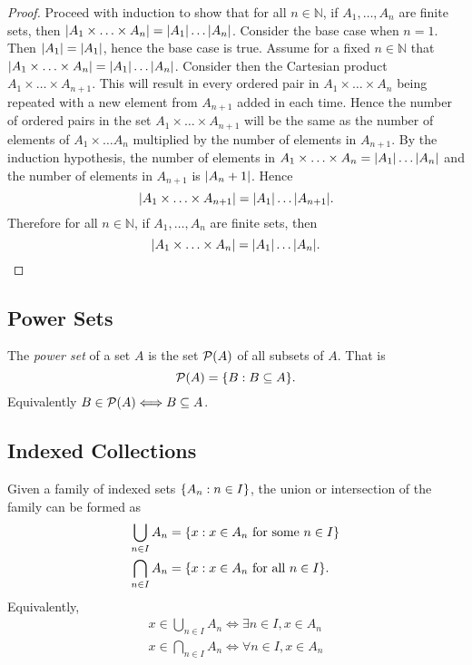 \documentclass[../notes.tex]{subfiles}
\begin{document}
\begin{proof}
	Proceed with induction to show that for all $n\in\mathbb{N}$, if $A_1, \ldots , A_n$ are finite sets, then $\qty|A_1 \times \ldots \times A_n| = \qty|A_1| \ldots \qty|A_n|$. Consider the base case when $n = 1$. Then $\qty|A_1| = \qty|A_1|$, hence the base case is true. Assume for a fixed $n \in \mathbb{N}$ that $\qty|A_1 \times \ldots \times A_n| = \qty|A_1| \ldots \qty|A_n|$. Consider then the Cartesian product $A_1 \times \ldots \times A_{n+1}$. This will result in every ordered pair in $A_1 \times \ldots \times A_n$ being repeated with a new element from $A_{n+1}$ added in each time. Hence the number of ordered pairs in the set $A_1 \times \ldots \times A_{n+1}$ will be the same as the number of elements of $A_1 \times \ldots A_n$ multiplied by the number of elements in $A_{n+1}$. By the induction hypothesis, the number of elements in $A_1 \times \ldots \times A_n = \qty|A_1| \ldots \qty|A_n|$ and the number of elements in $A_{n+1}$ is $\qty|A_n+1|$. Hence
	\[
		\qty|A_1 \times \ldots \times A_{n+1}| = \qty|A_1| \ldots \qty|A_{n+1}|
	.\]
	Therefore for all $n\in\mathbb{N}$, if $A_1, \ldots , A_n$ are finite sets, then 
	\[
		\qty|A_1 \times \ldots \times A_n| = \qty|A_1| \ldots \qty|A_n|
	.\]
\end{proof}

\subsection{Power Sets}

\begin{definition}
	The \textit{power set} of a set $A$ is the set $\mathcal{P}(A)$ of all subsets of $A$. That is
	\[
		\mathcal{P}(A) = \qty{B : B \subseteq A}
	.\]
	Equivalently $B \in \mathcal{P}(A) \Longleftrightarrow B \subseteq A$.
\end{definition}

\subsection{Indexed Collections}

\begin{definition}
	Given a family of indexed sets $\qty{A_n : n \in I}$, the union or intersection of the family can be formed as
	\begin{align*}
		\bigcup_{n \in I} A_n &= \qty{x : x \in A_n \text{ for some } n \in I} \\
		\bigcap_{n \in I} A_n &= \qty{x : x \in A_n \text{ for all } n \in I}
	.\end{align*}
	Equivalently,
	\begin{align*}
		x \in \bigcup_{n \in I} A_n \Longleftrightarrow \exists n \in I, x \in A_n \\
		x \in \bigcap_{n \in I} A_n \Longleftrightarrow \forall n \in I, x \in A_n
	\end{align*}
\end{definition}
\end{document}
